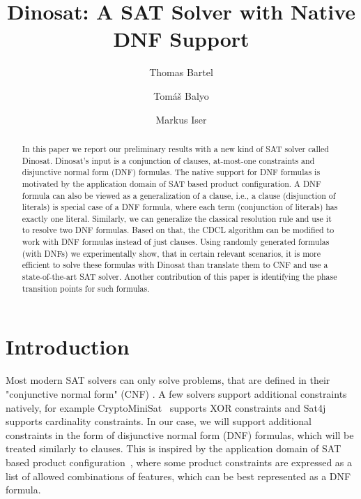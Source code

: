 \documentclass{easychair}
\title{Dinosat: A SAT Solver with Native DNF Support}
\author{
Thomas Bartel\inst{1}
\and
    Tom\'a\v{s} Balyo\inst{1}
\and
   Markus Iser\inst{2}
}
\institute{
  CAS Software,
  Karlsruhe, Germany\\
  \email{thomas.bartel@cas.de, tomas.balyo@cas.de}
\and
   Karslruhe Institute of Technology,
   Karlsruhe, Germany\\
   \email{markus.iser@kit.edu}\\
 }
\begin{document}
\maketitle

\begin{abstract}
In this paper we report our preliminary results with a new kind of SAT solver called Dinosat. Dinosat's input is a conjunction of clauses, at-most-one constraints and disjunctive normal form (DNF) formulas. The native support for DNF formulas is motivated by the application domain of SAT based product configuration. A DNF formula can also be viewed as a generalization of a clause, i.e., a clause (disjunction of literals) is special case of a DNF formula, where each term (conjunction of literals) has exactly one literal. Similarly, we can generalize the classical resolution rule and use it to resolve two DNF formulas. Based on that, the CDCL algorithm can be modified to work with DNF formulas instead of just clauses. Using randomly generated formulas (with DNFs) we experimentally show, that in certain relevant scenarios, it is more efficient to solve these formulas with Dinosat than translate them to CNF and use a state-of-the-art SAT solver. Another contribution of this paper is identifying the phase transition points for such formulas.
\end{abstract}


%
%

\section{Introduction}
\label{sect:introduction}
Most modern SAT solvers can only solve problems, that are defined in their "conjunctive normal form" (CNF) \cite{biere2009handbook}. A few solvers support additional constraints natively, for example CryptoMiniSat~\cite{DBLP:conf/sat/SoosNC09} supports XOR constraints and Sat4j~\cite{le2010sat4j} supports cardinality constraints. In our case, we will support additional constraints in the form of disjunctive normal form (DNF) formulas, which will be treated similarly to clauses. This is inspired by the application domain of SAT based product configuration~\cite{janota2010sat}, where some product constraints are expressed as a list of allowed combinations of features, which can be best represented as a DNF formula.
\end{document}
